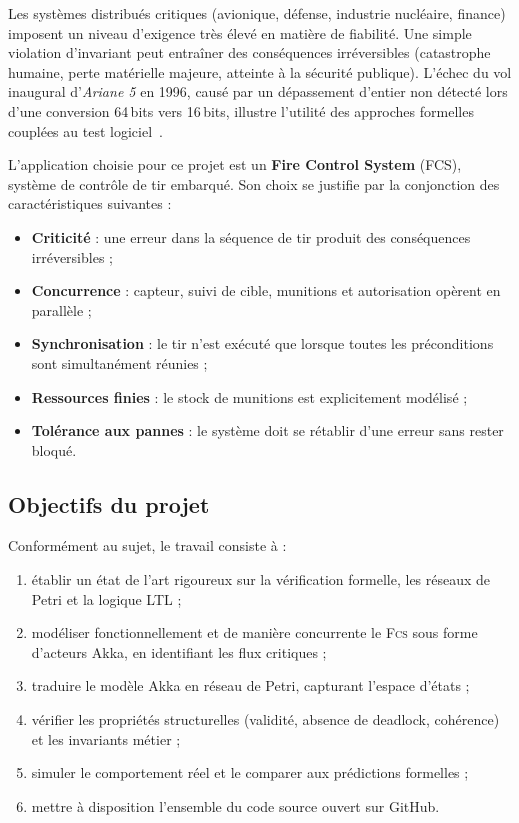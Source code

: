 \documentclass[11pt,a4paper]{article}
\newcommand{\fcs}{\textsc{Fcs}\xspace}
\begin{document}
Les systèmes distribués critiques (avionique, défense, industrie nucléaire,
finance) imposent un niveau d'exigence très élevé en matière de fiabilité.
Une simple violation d'invariant peut entraîner des conséquences irréversibles
(catastrophe humaine, perte matérielle majeure, atteinte à la sécurité publique).
L'échec du vol inaugural d'\emph{Ariane 5} en 1996, causé par un dépassement
d'entier non détecté lors d'une conversion 64\,bits vers 16\,bits, illustre l'utilité
des approches formelles couplées au test logiciel~\cite{lions1996ariane}.

L'application choisie pour ce projet est un \textbf{Fire Control System} (FCS),
système de contrôle de tir embarqué. Son choix se justifie par la conjonction des
caractéristiques suivantes :

\begin{itemize}[leftmargin=1.2cm,itemsep=2pt]
  \item \textbf{Criticité} : une erreur dans la séquence de tir produit des
        conséquences irréversibles ;
  \item \textbf{Concurrence} : capteur, suivi de cible, munitions et autorisation
        opèrent en parallèle ;
  \item \textbf{Synchronisation} : le tir n'est exécuté que lorsque toutes les
        préconditions sont simultanément réunies ;
  \item \textbf{Ressources finies} : le stock de munitions est explicitement modélisé ;
  \item \textbf{Tolérance aux pannes} : le système doit se rétablir d'une erreur
        sans rester bloqué.
\end{itemize}

\subsection{Objectifs du projet}

Conformément au sujet, le travail consiste à :
\begin{enumerate}[leftmargin=1.2cm,itemsep=2pt]
  \item établir un état de l'art rigoureux sur la vérification formelle, les
        réseaux de Petri et la logique LTL ;
  \item modéliser fonctionnellement et de manière concurrente le \fcs sous forme
        d'acteurs Akka, en identifiant les flux critiques ;
  \item traduire le modèle Akka en réseau de Petri, capturant l'espace d'états ;
  \item vérifier les propriétés structurelles (validité, absence de deadlock,
        cohérence) et les invariants métier ;
  \item simuler le comportement réel et le comparer aux prédictions formelles ;
  \item mettre à disposition l'ensemble du code source ouvert sur GitHub.
\end{enumerate}
\end{document}
